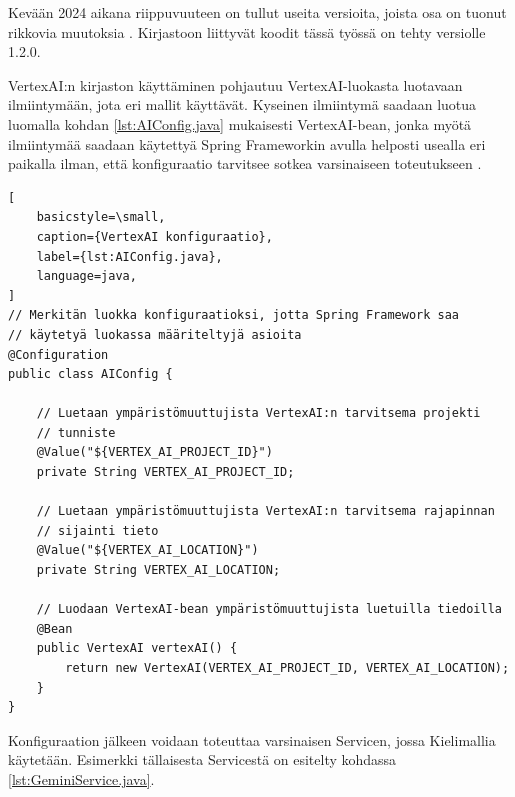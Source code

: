 Kevään 2024 aikana riippuvuuteen on tullut useita versioita, joista osa on
tuonut rikkovia muutoksia \parencite{mavenGoogleVertexAIAPI}. Kirjastoon
liittyvät koodit tässä työssä on tehty versiolle 1.2.0.

VertexAI:n kirjaston käyttäminen pohjautuu VertexAI-luokasta luotavaan
ilmiintymään, jota eri mallit käyttävät. Kyseinen ilmiintymä saadaan luotua
luomalla kohdan \ref{lst:AIConfig.java} mukaisesti VertexAI-bean, jonka myötä
ilmiintymää saadaan käytettyä Spring Frameworkin avulla helposti usealla eri
paikalla ilman, että konfiguraatio tarvitsee sotkea varsinaiseen toteutukseen
\parencite{baeldungSpringBean}.

\begin{lstlisting}[
    basicstyle=\small,
    caption={VertexAI konfiguraatio},
    label={lst:AIConfig.java},
    language=java,
]
// Merkitän luokka konfiguraatioksi, jotta Spring Framework saa
// käytetyä luokassa määriteltyjä asioita
@Configuration
public class AIConfig {

    // Luetaan ympäristömuuttujista VertexAI:n tarvitsema projekti
    // tunniste
    @Value("${VERTEX_AI_PROJECT_ID}")
    private String VERTEX_AI_PROJECT_ID;

    // Luetaan ympäristömuuttujista VertexAI:n tarvitsema rajapinnan
    // sijainti tieto
    @Value("${VERTEX_AI_LOCATION}")
    private String VERTEX_AI_LOCATION;

    // Luodaan VertexAI-bean ympäristömuuttujista luetuilla tiedoilla
    @Bean
    public VertexAI vertexAI() {
        return new VertexAI(VERTEX_AI_PROJECT_ID, VERTEX_AI_LOCATION);
    }
}
\end{lstlisting}

Konfiguraation jälkeen voidaan toteuttaa varsinaisen Servicen, jossa
Kielimallia käytetään. Esimerkki tällaisesta Servicestä on esitelty
kohdassa \ref{lst:GeminiService.java}.

